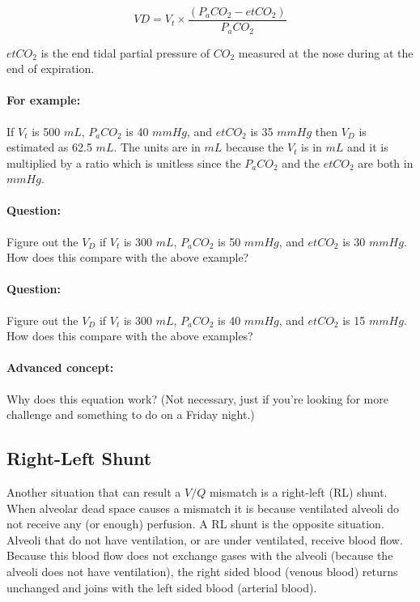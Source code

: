 \begin{equation}
    VD = V_t \times \frac{(P_aCO_2 - etCO_2)}{P_aCO_2}
    \label{eq:bohr}
 \end{equation}
 
$etCO_2$ is the end tidal partial pressure of $CO_2$ measured at the nose during at the end of expiration.

\paragraph{For example:} If $V_t$ is 500 $mL$, $P_aCO_2$ is 40 $mmHg$, and $etCO_2$ is 35 $mmHg$ then $V_D$ is estimated as 62.5 $mL$. The units are in $mL$ because the $V_t$ is in $mL$ and it is multiplied by a ratio which is unitless since the $P_aCO_2$ and the $etCO_2$ are both in $mmHg$.

\paragraph{Question:} Figure out the $V_D$ if $V_t$ is 300 $mL$, $P_aCO_2$ is 50 $mmHg$, and $etCO_2$ is 30 $mmHg$. How does this compare with the above example? 

\paragraph{Question:} Figure out the $V_D$ if $V_t$ is 300 $mL$, $P_aCO_2$ is 40 $mmHg$, and $etCO_2$ is 15 $mmHg$. How does this compare with the above examples?

\paragraph{Advanced concept:} Why does this equation work? (Not necessary, just if you're looking for more challenge and something to do on a Friday night.)

\subsection{Right-Left Shunt}

Another situation that can result a $V/Q$ mismatch is a right-left (RL) shunt. When alveolar dead space causes a mismatch it is because ventilated alveoli do not receive any (or enough) perfusion. A RL shunt is the opposite situation. Alveoli that do not have ventilation, or are under ventilated, receive blood flow. Because this blood flow does not exchange gases with the alveoli (because the alveoli does not have ventilation), the right sided blood (venous blood) returns unchanged and joins with the left sided blood (arterial blood). 

